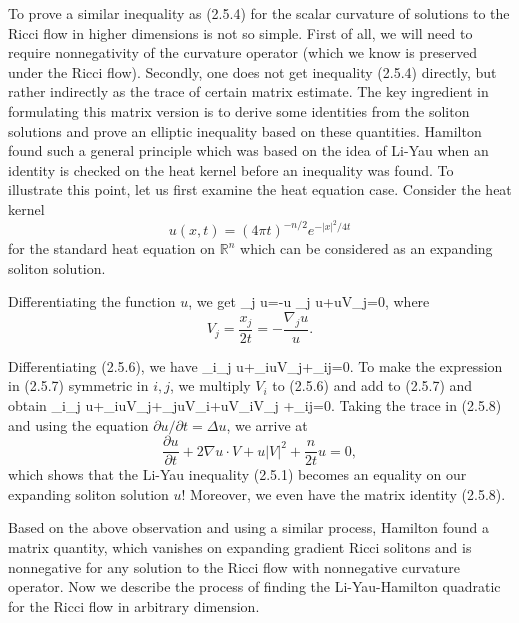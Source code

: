 To prove a similar inequality as (2.5.4) for the scalar curvature
of solutions to the Ricci flow in higher dimensions is not so
simple. First of all, we will need to require nonnegativity of the
curvature operator (which we know is preserved under the Ricci
flow).  Secondly, one does not get inequality (2.5.4) directly,
but rather indirectly as the trace of certain matrix estimate. The
key ingredient in formulating this matrix version is to derive
some identities from the soliton solutions and prove an elliptic
inequality based on these quantities. Hamilton found such a
general principle which was based on the idea of Li-Yau \cite{LY}
when an identity is checked on the heat kernel before an
inequality was found. To illustrate this point, let us first
examine the heat equation case. Consider the heat kernel
$$
u(x,t)=(4\pi t)^{-n/2} e^{-|x|^2/4t}
$$
for the standard heat equation on $\mathbb R^n$ which can be
considered as an expanding soliton solution.

Differentiating the function $u$, we get \be \nabla_j u=-u
 \; \;
\nabla_j u+uV_j=0,%
\ee where
$$
V_j=\frac{x_j}{2t}=-\frac{\nabla_j u}{u}.
$$

Differentiating (2.5.6), we have \be \nabla_i\nabla_j
u+\nabla_iuV_j+\delta_{ij}=0.
\ee To make the expression in (2.5.7) symmetric in $i, j$, we
multiply $V_i$ to (2.5.6) and add to (2.5.7) and obtain \be
\nabla_i\nabla_j u+\nabla_iuV_j+\nabla_juV_i+uV_iV_j
+\delta_{ij}=0. %
\ee Taking the trace in (2.5.8) and using the equation ${\partial
u}/{\partial t}=\Delta u$, we arrive at
$$
\frac{\partial u}{\partial t} +2\nabla u\cdot V+u|V|^2
+\frac{n}{2t} u=0,
$$
which shows that the Li-Yau inequality (2.5.1) becomes an equality
on our expanding soliton solution $u$! Moreover, we even have the
matrix identity (2.5.8).

Based on the above observation and using a similar process,
Hamilton found a matrix quantity, which vanishes on expanding
gradient Ricci solitons and is nonnegative for any solution to the
Ricci flow with nonnegative curvature operator. Now we describe
the process of finding the Li-Yau-Hamilton quadratic for the Ricci
flow in arbitrary dimension.

